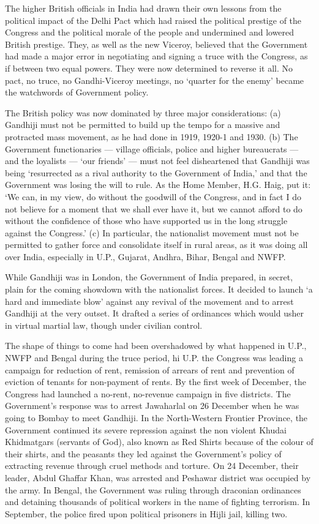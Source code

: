 The higher British officials in India had drawn their own lessons from the political impact of the Delhi Pact which had raised the political prestige of the Congress and the political morale of the people and undermined and lowered British prestige. They, as well as the new Viceroy, believed that the Government had made a major error in negotiating and signing a truce with the Congress, as if between two equal powers. They were now determined to reverse it all. No pact, no truce, no Gandhi-Viceroy meetings, no `quarter for the enemy' became the watchwords of Government policy. 

The British policy was now dominated by three major considerations: (a) Gandhiji must not be permitted to build up the tempo for a massive and protracted mass movement, as he had done in 1919, 1920-1 and 1930. (b) The Government functionaries — village officials, police and higher bureaucrats — and the loyalists — `our friends' — must not feel disheartened that Gandhiji was being `resurrected as a rival authority to the Government of India,' and that the Government was losing the will to rule. As the Home Member, H.G. Haig, put it: `We can, in my view, do without the goodwill of the Congress, and in fact I do not believe for a moment that we shall ever have it, but we cannot afford to do without the confidence of those who have supported us in the long struggle against the Congress.' (c) In particular, the nationalist movement must not be permitted to gather force and consolidate itself in rural areas, as it was doing all over India, especially in U.P., Gujarat, Andhra, Bihar, Bengal and NWFP. 

While Gandhiji was in London, the Government of India prepared, in secret, plain for the coming showdown with the nationalist forces. It decided to launch `a hard and immediate blow' against any revival of the movement and to arrest Gandhiji at the very outset. It drafted a series of ordinances which would usher in virtual martial law, though under civilian control. 

The shape of things to come had been overshadowed by what happened in U.P., NWFP and Bengal during the truce period, hi U.P. the Congress was leading a campaign for reduction of rent, remission of arrears of rent and prevention of eviction of tenants for non-payment of rents. By the first week of December, the Congress had launched a no-rent, no-revenue campaign in five districts. The Government's response was to arrest Jawaharlal on 26 December when he was going to Bombay to meet Gandhiji. In the North-Western Frontier Province, the Government continued its severe repression against the non­ violent Khudai Khidmatgars (servants of God), also known as Red Shirts because of the colour of their shirts, and the peasants they led against the Government's policy of extracting revenue through cruel methods and torture. On 24 December, their leader, Abdul Ghaffar Khan, was arrested and Peshawar district was occupied by the army. In Bengal, the Government was ruling through draconian ordinances and detaining thousands of political workers in the name of fighting terrorism. In September, the police fired upon political prisoners in Hijli jail, killing two. 

